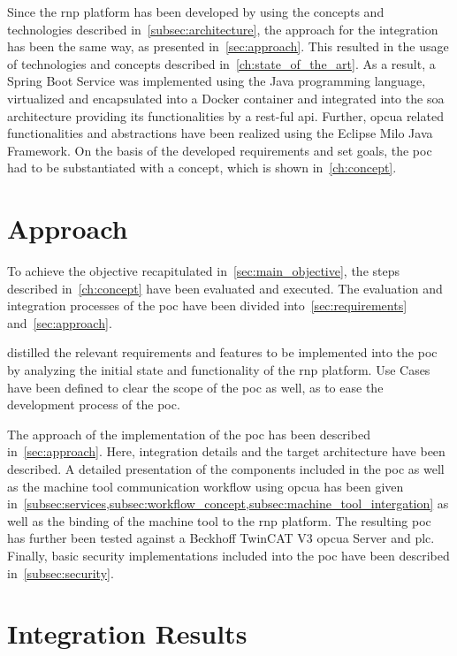 \documentclass[
a4paper,
twoside,
headsepline,
cleardoublepage=empty,
parskip=half,
draft=false
]{scrbook}
\begin{document}
			Since the \gls{rnp} platform has been developed by using the concepts and technologies described in~\cref{subsec:architecture}, the approach for the integration has been the same way, as presented in~\cref{sec:approach}. This resulted in the usage of technologies and concepts described in~\cref{ch:state_of_the_art}. As a result, a Spring Boot Service was implemented using the Java programming language, virtualized and encapsulated into a Docker container and integrated into the \gls{soa} architecture providing its functionalities by a \gls{rest}-ful \gls{api}. Further, \gls{opcua} related functionalities and abstractions have been realized using the Eclipse Milo Java Framework. 
			On the basis of the developed requirements and set goals, the \gls{poc} had to be substantiated with a concept, which is shown in~\cref{ch:concept}.
		
		\section{Approach}\label{sec:discussion_approach}
		
			To achieve the objective recapitulated in~\cref{sec:main_objective}, the steps described in~\cref{ch:concept} have been evaluated and executed. The evaluation and integration processes of the \gls{poc} have been divided into~\cref{sec:requirements} and~\cref{sec:approach}.
			
			 distilled the relevant requirements and features to be implemented into the \gls{poc} by analyzing the initial state and functionality of the \gls{rnp} platform. Use Cases have been defined to clear the scope of the \gls{poc} as well, as to ease the development process of the \gls{poc}.
			
			The approach of the implementation of the \gls{poc} has been described in~\cref{sec:approach}. Here, integration details and the target architecture have been described. A detailed presentation of the components included in the \gls{poc} as well as the machine tool communication workflow using \gls{opcua} has been given in~\cref{subsec:services,subsec:workflow_concept,subsec:machine_tool_intergation} as well as the binding of the machine tool to the \gls{rnp} platform. 
			The resulting \gls{poc} has further been tested against a Beckhoff TwinCAT V3 \gls{opcua} Server and \gls{plc}.
			Finally, basic security implementations included into the \gls{poc} have been described in~\cref{subsec:security}.
			
		\section{Integration Results}\label{sec:integration_results}
\end{document}
